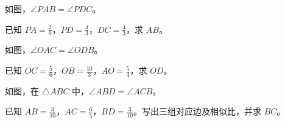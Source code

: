 \documentclass{exam-zh}
\begin{document}

\begin{problem}[points=10]
  \noindent
  \begin{minipage}[t]{\dimexpr\linewidth-60mm-6mm\relax}
    \vspace{0pt}
    如图，$\angle PAB=\angle PDC$。

已知 $PA=\frac{2}{9}$，$PD=\frac{4}{3}$，$DC=\frac{4}{3}$，求 $AB$。
    
  \end{minipage}\hfill
  \begin{diagramcoltikz}{60mm}{沿题设等角的顶点顺序，找出两组三角形的对应边。}
  }
  \end{diagramcoltikz}
  \par\medskip
  \answerarea[48mm]
\end{problem}



\begin{problem}[points=10]
  \noindent
  \begin{minipage}[t]{\dimexpr\linewidth-60mm-6mm\relax}
    \vspace{0pt}
    如图，$\angle OAC=\angle ODB$。

已知 $OC=\frac{5}{6}$，$OB=\frac{10}{3}$，$AO=\frac{5}{4}$，求 $OD$。
    
  \end{minipage}\hfill
  \begin{diagramcoltikz}{60mm}{先用对顶角补齐第二组等角，再按顶点顺序配边。}
  }
  \end{diagramcoltikz}
  \par\medskip
  \answerarea[48mm]
\end{problem}



\begin{problem}[points=10]
  \noindent
  \begin{minipage}[t]{\dimexpr\linewidth-60mm-6mm\relax}
    \vspace{0pt}
    如图，在 $\triangle ABC$ 中，$\angle ABD=\angle ACB$。

已知 $AB=\frac{3}{10}$，$AC=\frac{6}{5}$，$BD=\frac{3}{10}$。写出三组对应边及相似比，并求 $BC$。
    
  \end{minipage}\hfill
  \begin{diagramcoltikz}{60mm}{先确认对应边，再判断题中的线段是否属于相似三角形。}
  }
  \end{diagramcoltikz}
  \par\medskip
  \answerarea[48mm]
\end{problem}
\end{document}
